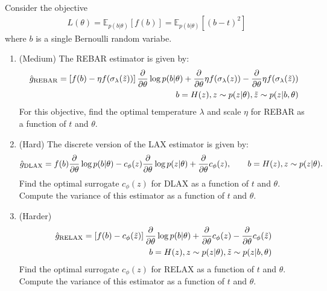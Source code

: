 \documentclass{harvardml}
\newcommand{\E}{\mathbb{E}}
\newcommand{\PT}{\frac{\partial}{\partial \theta}}
\newcommand{\LAX}{{\textnormal{LAX}}}
\newcommand{\DLAX}{{\textnormal{DLAX}}}
\theoremstyle{plain}
\begin{document}









\begin{problem}

Consider the objective
%
\begin{align}
L(\theta) 
= \E_{p(b|\theta)} \left[ f(b) \right]
= \E_{p(b|\theta)} \left[ (b - t)^2 \right]
\end{align}
%
where $b$ is a single Bernoulli random variabe.


\begin{enumerate}[label=(\alph*)]
\item (Medium) The REBAR estimator is given by:
\begin{align}
\hat g_\textnormal{REBAR} = \left[ f(b) - \eta f(\sigma_\lambda(\tilde{z})) \right] \PT \log p(b|\theta) + \PT \eta f(\sigma_\lambda(z)) - \PT \eta f(\sigma_\lambda(\tilde{z})) \\
\qquad b = H(z), z \sim p(z|\theta), \tilde{z} \sim p(z|b, \theta) \nonumber
\end{align}
%
For this objective, find the optimal temperature $\lambda$ and scale $\eta$ for REBAR as a function of $t$ and $\theta$.
\item (Hard) The discrete version of the \LAX{} estimator is given by:
%
\begin{align}
\label{eq:discrete lax}
\hat g_\DLAX = f(b) \PT \log p(b|\theta) - c_\phi(z) \PT \log p(z|\theta) + \PT c_\phi(z), \qquad b = H(z), z \sim p(z|\theta).
\end{align}
%
Find the optimal surrogate $c_\phi(z)$ for DLAX as a function of $t$ and $\theta$.
Compute the variance of this estimator as a function of $t$ and $\theta$.
\item (Harder) %
\begin{align}
\hat g_\textnormal{RELAX} = \left[ f(b) - c_\phi(\tilde{z}) \right] \PT \log p(b|\theta) + \PT c_\phi(z) - \PT c_\phi (\tilde{z}) \\
\qquad b = H(z), z \sim p(z|\theta), \tilde{z} \sim p(z|b, \theta) \nonumber
\end{align}
%
Find the optimal surrogate $c_\phi(z)$ for RELAX as a function of $t$ and $\theta$.
Compute the variance of this estimator as a function of $t$ and $\theta$.
\end{enumerate}
\end{problem}
\end{document}
